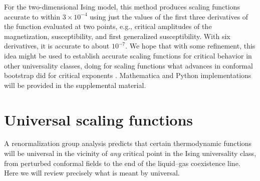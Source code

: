 \documentclass[
aps,
pre,
preprint,
longbibliography,
floatfix
]{revtex4-2}
\begin{document}
For the two-dimensional Ising model, this method produces scaling functions
accurate to within $3\times 10^{-4}$ using just the values of the first three
derivatives of the function evaluated at two points, e.g., critical amplitudes
of the magnetization, susceptibility, and first generalized susceptibility.
With six derivatives, it is accurate to about $10^{-7}$. We hope that with some
refinement, this idea might be used to establish accurate scaling functions for
critical behavior in other universality classes, doing for scaling functions
what advances in conformal bootstrap did for critical exponents
\cite{Gliozzi_2014_Critical}. Mathematica and Python implementations will be provided in the supplemental material.

\section{Universal scaling functions}
\label{sec:UniversalScalingFunctions}

A renormalization group analysis predicts that certain thermodynamic functions
will be universal in the vicinity of \emph{any} critical point in the Ising
universality class, from perturbed conformal fields to the end of the
liquid--gas coexistence line. Here we will review precisely what is meant by
universal.
\end{document}
